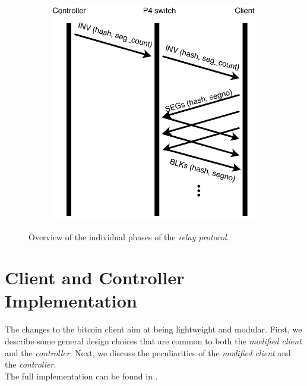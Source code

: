 \begin{figure}[!bt]
\begin{center}
\begin{subfigure}[b]{0.32\textwidth}
  \label{figure:upd}
\end{subfigure}
\begin{subfigure}[b]{0.32\textwidth}
	\includegraphics[width=\textwidth]{Figures/INV.pdf}
  \label{figure:inv}
\end{subfigure}
\caption[Overview of the individual phases of the relay protocol.]{Overview of the individual phases of the \textit{relay protocol}.}
\label{figure:messagingProtocol}
\end{center}
\end{figure}




\section{Client and Controller Implementation  \label{sec:design:design}}
The changes to the bitcoin client aim at being lightweight and modular. First, we describe some general design choices that are common to both the \textit{modified client} and the \textit{controller}. Next, we discuss the peculiarities of the \textit{modified client} and the \textit{controller}.\\
The full implementation can be found in \cite{bitcoinFork}.

